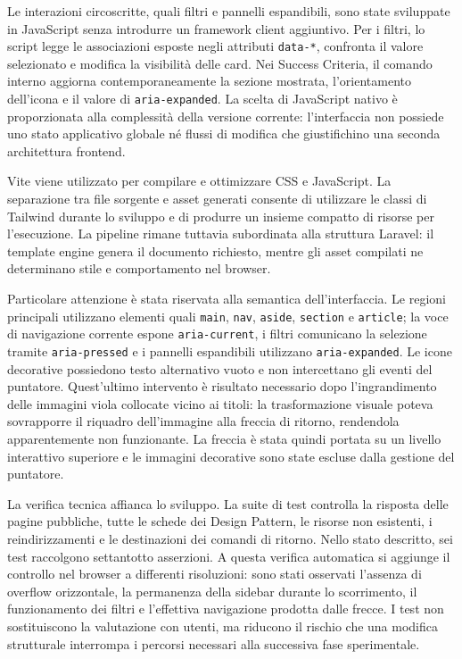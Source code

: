 Le interazioni circoscritte, quali filtri e pannelli espandibili, sono state sviluppate in JavaScript senza introdurre un framework client aggiuntivo. Per i filtri, lo script legge le associazioni esposte negli attributi \texttt{data-*}, confronta il valore selezionato e modifica la visibilità delle card. Nei Success Criteria, il comando interno aggiorna contemporaneamente la sezione mostrata, l'orientamento dell'icona e il valore di \texttt{aria-expanded}. La scelta di JavaScript nativo è proporzionata alla complessità della versione corrente: l'interfaccia non possiede uno stato applicativo globale né flussi di modifica che giustifichino una seconda architettura frontend.

Vite viene utilizzato per compilare e ottimizzare CSS e JavaScript. La separazione tra file sorgente e asset generati consente di utilizzare le classi di Tailwind durante lo sviluppo e di produrre un insieme compatto di risorse per l'esecuzione. La pipeline rimane tuttavia subordinata alla struttura Laravel: il template engine genera il documento richiesto, mentre gli asset compilati ne determinano stile e comportamento nel browser.

Particolare attenzione è stata riservata alla semantica dell'interfaccia. Le regioni principali utilizzano elementi quali \texttt{main}, \texttt{nav}, \texttt{aside}, \texttt{section} e \texttt{article}; la voce di navigazione corrente espone \texttt{aria-current}, i filtri comunicano la selezione tramite \texttt{aria-pressed} e i pannelli espandibili utilizzano \texttt{aria-expanded}. Le icone decorative possiedono testo alternativo vuoto e non intercettano gli eventi del puntatore. Quest'ultimo intervento è risultato necessario dopo l'ingrandimento delle immagini viola collocate vicino ai titoli: la trasformazione visuale poteva sovrapporre il riquadro dell'immagine alla freccia di ritorno, rendendola apparentemente non funzionante. La freccia è stata quindi portata su un livello interattivo superiore e le immagini decorative sono state escluse dalla gestione del puntatore.

La verifica tecnica affianca lo sviluppo. La suite di test controlla la risposta delle pagine pubbliche, tutte le schede dei Design Pattern, le risorse non esistenti, i reindirizzamenti e le destinazioni dei comandi di ritorno. Nello stato descritto, sei test raccolgono settantotto asserzioni. A questa verifica automatica si aggiunge il controllo nel browser a differenti risoluzioni: sono stati osservati l'assenza di overflow orizzontale, la permanenza della sidebar durante lo scorrimento, il funzionamento dei filtri e l'effettiva navigazione prodotta dalle frecce. I test non sostituiscono la valutazione con utenti, ma riducono il rischio che una modifica strutturale interrompa i percorsi necessari alla successiva fase sperimentale.

